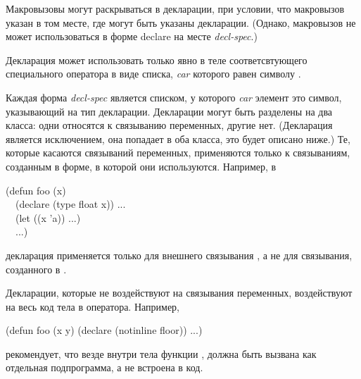 \begin{defspec}
Макровызовы могут раскрываться в декларации, при условии, что макровызов указан
в том месте, где могут быть указаны декларации.
(Однако, макровызов не может использоваться в форме declare на месте
\emph{decl-spec}.)

Декларация может использовать только явно в теле соответсвтующего специального
оператора в виде списка, \emph{car} которого равен символу .

Каждая форма \emph{decl-spec} является списком, у которого \emph{car} элемент
это символ, указывающий на тип декларации. Декларации могут быть разделены на
два класса: одни относятся к связыванию переменных, другие нет.
(Декларация  является исключением, она попадает в оба класса, это
будет описано ниже.) 
Те, которые касаются связываний переменных, применяются только к связываниям,
созданным в форме, в которой они используются. Например, в 
\begin{lisp}
(defun foo (x) \\
~~(declare (type float x)) ... \\
~~(let ((x 'a)) ...) \\
~~...)
\end{lisp}
декларация  применяется только для внешнего связывания , а не
для связывания, созданного в .

Декларации, которые не воздействуют на связывания переменных, воздействуют на
весь код тела в оператора.
Например,
\begin{lisp}
(defun foo (x y) (declare (notinline floor)) ...)
\end{lisp}
рекомендует, что везде внутри тела функции ,  должна быть
вызвана как отдельная подпрограмма, а не встроена в код.


\end{defspec}
